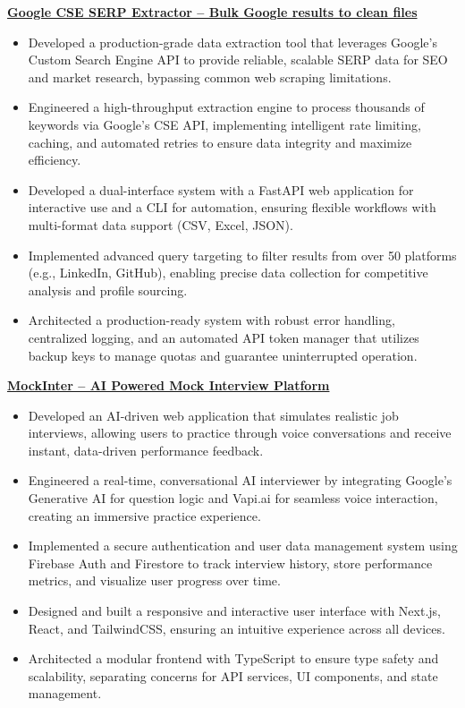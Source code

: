 \documentclass[a4paper,11pt]{article}
\begin{document}
\textbf{\href{https://github.com/NgnPhamGiaHuy/google-cse-serp-extractor}{Google CSE SERP Extractor – Bulk Google results to clean files}}
\begin{itemize}[leftmargin=*, noitemsep, topsep=0pt, partopsep=0pt, parsep=0pt, itemsep=0pt]
    \item Developed a production-grade data extraction tool that leverages Google's Custom Search Engine API to provide reliable, scalable SERP data for SEO and market research, bypassing common web scraping limitations.
    \item Engineered a high-throughput extraction engine to process thousands of keywords via Google's CSE API, implementing intelligent rate limiting, caching, and automated retries to ensure data integrity and maximize efficiency.
    \item Developed a dual-interface system with a FastAPI web application for interactive use and a CLI for automation, ensuring flexible workflows with multi-format data support (CSV, Excel, JSON).
    \item Implemented advanced query targeting to filter results from over 50 platforms (e.g., LinkedIn, GitHub), enabling precise data collection for competitive analysis and profile sourcing.
    \item Architected a production-ready system with robust error handling, centralized logging, and an automated API token manager that utilizes backup keys to manage quotas and guarantee uninterrupted operation.
\end{itemize}
\textbf{\href{https://github.com/NgnPhamGiaHuy/mock-interview-platform}{MockInter – AI Powered Mock Interview Platform}}
\begin{itemize}[leftmargin=*, noitemsep, topsep=0pt, partopsep=0pt, parsep=0pt, itemsep=0pt]
    \item Developed an AI-driven web application that simulates realistic job interviews, allowing users to practice through voice conversations and receive instant, data-driven performance feedback.
    \item Engineered a real-time, conversational AI interviewer by integrating Google's Generative AI for question logic and Vapi.ai for seamless voice interaction, creating an immersive practice experience.
    \item Implemented a secure authentication and user data management system using Firebase Auth and Firestore to track interview history, store performance metrics, and visualize user progress over time.
    \item Designed and built a responsive and interactive user interface with Next.js, React, and TailwindCSS, ensuring an intuitive experience across all devices.
    \item Architected a modular frontend with TypeScript to ensure type safety and scalability, separating concerns for API services, UI components, and state management.
\end{itemize}
\end{document}
